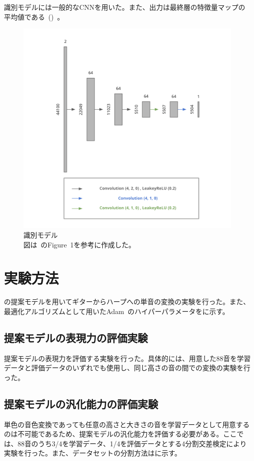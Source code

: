 識別モデルには一般的なCNNを用いた。また、出力は最終層の特徴量マップの平均値である~()~。

\begin{figure}[b]
\centering
\includegraphics[width=0.6\columnwidth]{figure/pr_discriminator.png}
\caption[本研究の識別モデル]{識別モデル\\
図は~\cite{u-net}のFigure~1を参考に作成した。}
\label{fig:pr_dis}
\end{figure}

\section{実験方法}

の提案モデルを用いてギターからハープへの単音の変換の実験を行った。また、最適化アルゴリズムとして用いたAdam~\cite{Adam}のハイパーパラメータをに示す。

\subsection{提案モデルの表現力の評価実験}

提案モデルの表現力を評価する実験を行った。具体的には、用意した88音を学習データと評価データのいずれでも使用し、同じ高さの音の間での変換の実験を行った。

\subsection{提案モデルの汎化能力の評価実験}

単色の音色変換であっても任意の高さと大きさの音を学習データとして用意するのは不可能であるため、提案モデルの汎化能力を評価する必要がある。ここでは、88音のうち3/4を学習データ、1/4を評価データとする4分割交差検定により実験を行った。また、データセットの分割方法はに示す。

